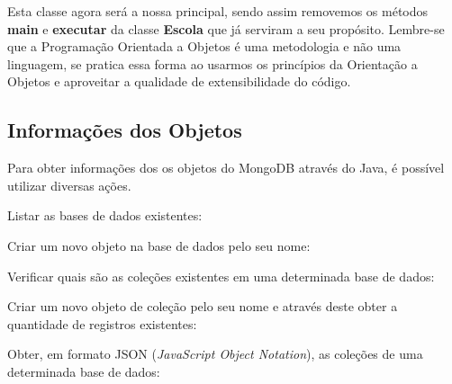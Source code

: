 \documentclass[a4paper,11pt]{article}
\begin{document}
Esta classe agora será a nossa principal, sendo assim removemos os métodos \textbf{main} e \textbf{executar} da classe \textbf{Escola} que já serviram a seu propósito. Lembre-se que a Programação Orientada a Objetos é uma metodologia e não uma linguagem, se pratica essa forma ao usarmos os princípios da Orientação a Objetos e aproveitar a qualidade de extensibilidade do código.

\subsection{Informações dos Objetos}
Para obter informações dos os objetos do MongoDB através do Java, é possível utilizar diversas ações. 

Listar as bases de dados existentes: \\

Criar um novo objeto na base de dados pelo seu nome: \\

Verificar quais são as coleções existentes em uma determinada base de dados: \\

Criar um novo objeto de coleção pelo seu nome e através deste obter a quantidade de registros existentes: \\

Obter, em formato JSON (\textit{JavaScript Object Notation}), as coleções de uma determinada base de dados: \\
\end{document}
